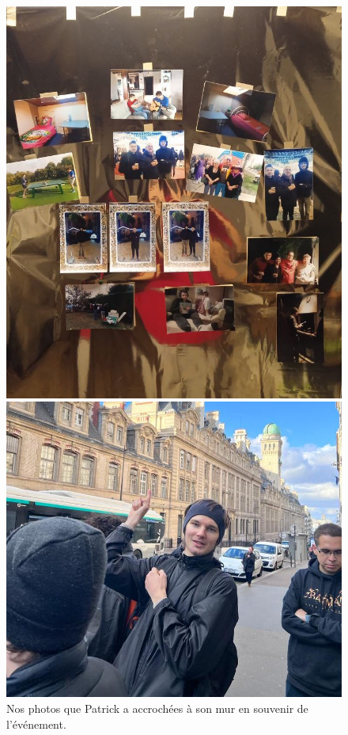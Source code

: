 \documentclass[a4paper,12pt]{article}
\begin{document}
\begin{figure}[htbp]
	\centering
	\begin{minipage}{0.3\textwidth}
		\centering
		\includegraphics[width=\linewidth]{3}
		\caption{Nos photos que Patrick a accrochées à son mur en souvenir de l'événement.}
		\label{fig:image1}
	\end{minipage}
	\hfill
	\begin{minipage}{0.3\textwidth}
		\centering
		\includegraphics[width=\linewidth]{33}

\end{minipage}
\end{figure}
\end{document}
